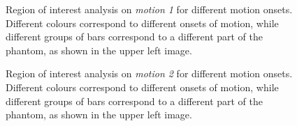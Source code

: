 \begin{figure}[ht]
    \caption{Region of interest analysis on \textit{motion 1} for different motion onsets.
    Different colours correspond to different onsets of motion, while different groups of bars correspond to a different part of the phantom, as shown in the upper left image.}
    \label{fig:appendixmotion1ROI}
\end{figure}

\begin{figure}[ht]
    \caption{Region of interest analysis on \textit{motion 2} for different motion onsets.
    Different colours correspond to different onsets of motion, while different groups of bars correspond to a different part of the phantom, as shown in the upper left image.}
    \label{fig:appendixmotion2ROI}
\end{figure}

